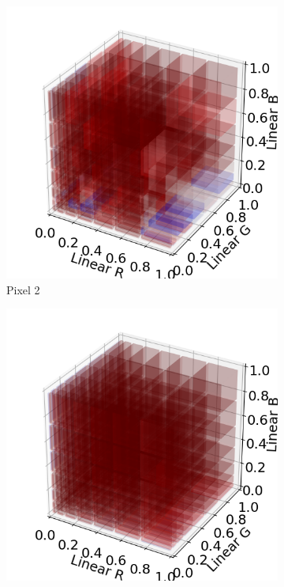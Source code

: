 \begin{figure}[tp]
	\begin{subfigure}[]{0.25\columnwidth}
		\includegraphics[width=\linewidth]{figure/002_Pixel2_error_cuve.png}
		\caption{Pixel 2}
	\end{subfigure}
	\hfill
	\begin{subfigure}[]{0.25\columnwidth}
		\includegraphics[width=\linewidth]{figure/003_MotoZ3_error_cuve.png}

\end{subfigure}
\end{figure}
